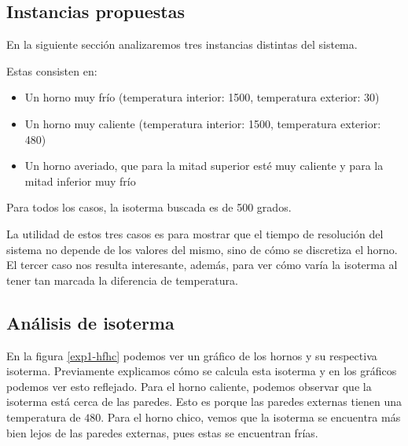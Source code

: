 \subsection{Instancias propuestas}

En la siguiente sección analizaremos tres instancias distintas del sistema.

Estas consisten en:
\begin{itemize}
    \item{Un horno muy frío (temperatura interior: 1500, temperatura exterior: 30)}
    \item{Un horno muy caliente (temperatura interior: 1500, temperatura exterior: 480)}
    \item{Un horno averiado, que para la mitad superior esté muy caliente y para la mitad inferior muy frío}
\end{itemize}

Para todos los casos, la isoterma buscada es de 500 grados.

La utilidad de estos tres casos es para mostrar que el tiempo de resolución del sistema no depende de los valores del mismo, sino de cómo se discretiza el horno. El tercer caso nos resulta interesante, además, para ver cómo varía la isoterma al tener tan marcada la diferencia de temperatura. 

\subsection{Análisis de isoterma}

En la figura \ref{exp1-hfhc} podemos ver un gráfico de los hornos y su respectiva isoterma. Previamente explicamos cómo se calcula esta isoterma y en los gráficos podemos ver esto reflejado. Para el horno caliente, podemos observar que la isoterma está cerca de las paredes. Esto es porque las paredes externas tienen una temperatura de $480$. Para el horno chico, vemos que la isoterma se encuentra más bien lejos de las paredes externas, pues estas se encuentran frías.  


